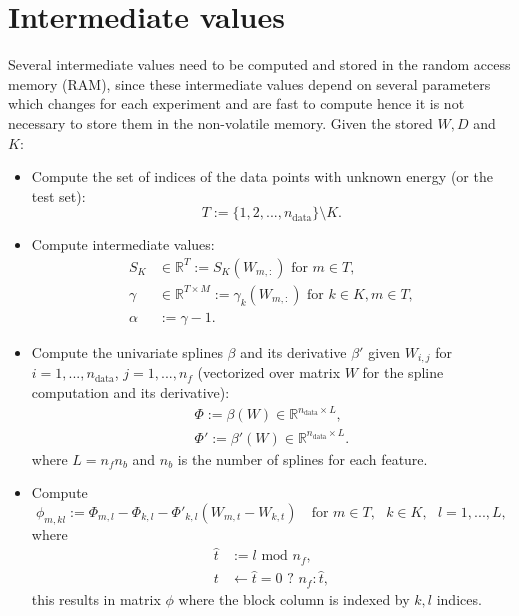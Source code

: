 \documentclass[12pt]{article}
\begin{document}
\section{Intermediate values}
Several intermediate values need to be computed and stored in the random access memory (RAM), since these intermediate values depend on several parameters which changes for each experiment and are fast to compute hence it is not necessary to store them in the non-volatile memory. Given the stored $W, D$ and $K$:
\begin{itemize}
	\item Compute the set of indices of the data points with unknown energy (or the test set):
	\begin{equation}
		T := \{1,2,...,n_\text{data}\} \setminus K.
	\end{equation}
	\item Compute intermediate values:
	\begin{equation}
		\begin{split}
			S_K &\in \mathbb{R}^{T} := S_K(W_{m,:}) \text{ for } m \in T,\\
			\gamma &\in \mathbb{R}^{T \times M} := \gamma_k(W_{m,:}) \text{ for } k \in K, m \in T, \\
			\alpha &:= \gamma - 1.
		\end{split}
	\end{equation}
	\item Compute the univariate splines $\beta$ and its derivative $\beta'$ given $W_{i,j}$ for $i = 1,...,n_\text{data}$, $j = 1,...,n_f$ (vectorized over matrix $W$ for the spline computation and its derivative):
	\begin{equation}
		\begin{split}
			\Phi := \beta(W) \in \mathbb{R}^{n_\text{data} \times L}, \\
			\Phi' := \beta'(W) \in \mathbb{R}^{n_\text{data} \times L}.
		\end{split}
	\end{equation}
	where $L = n_fn_b$ and $n_b$ is the number of splines for each feature.
	\item Compute
	\begin{equation} %
		\phi_{m, kl} := \Phi_{m,l} - \Phi_{k,l} - \Phi'_{k,l}(W_{m,t}-W_{k,t}) \quad \text{for } m \in T, \text{ }k \in K, \text{ }l = 1,...,L,
	\end{equation}
	where
	\begin{equation}
		\begin{split}
			\hat{t} &:= l \text{ mod } n_f, \\
			t &\leftarrow \hat{t} = 0 \text{ ? } n_f : \hat{t},
		\end{split}
	\end{equation}
	this results in matrix $\phi$ where the block column is indexed by $k,l$ indices.
\end{itemize}
\end{document}
